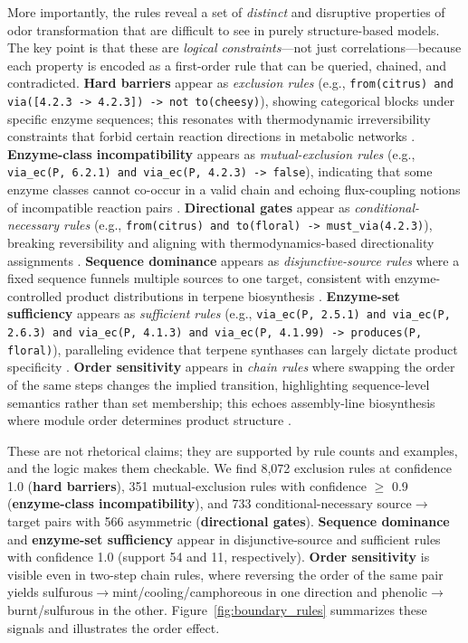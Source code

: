 \documentclass[a4paper,fleqn]{cas-sc}
\begin{document}
More importantly, the rules reveal a set of \emph{distinct} and disruptive properties of odor transformation that are difficult to see in purely structure-based models. The key point is that these are \emph{logical constraints}---not just correlations---because each property is encoded as a first-order rule that can be queried, chained, and contradicted. \textbf{Hard barriers} appear as \emph{exclusion rules} (e.g., \texttt{from(citrus) and via([4.2.3 -> 4.2.3]) -> not to(cheesy)}), showing categorical blocks under specific enzyme sequences; this resonates with thermodynamic irreversibility constraints that forbid certain reaction directions in metabolic networks \citep{Kummel2006,Martinez2014}. \textbf{Enzyme-class incompatibility} appears as \emph{mutual-exclusion rules} (e.g., \texttt{via\_ec(P, 6.2.1) and via\_ec(P, 4.2.3) -> false}), indicating that some enzyme classes cannot co-occur in a valid chain and echoing flux-coupling notions of incompatible reaction pairs \citep{Hosseini2017}. \textbf{Directional gates} appear as \emph{conditional-necessary rules} (e.g., \texttt{from(citrus) and to(floral) -> must\_via(4.2.3)}), breaking reversibility and aligning with thermodynamics-based directionality assignments \citep{Haraldsdottir2012}. \textbf{Sequence dominance} appears as \emph{disjunctive-source rules} where a fixed sequence funnels multiple sources to one target, consistent with enzyme-controlled product distributions in terpene biosynthesis \citep{Raz2020}. \textbf{Enzyme-set sufficiency} appears as \emph{sufficient rules} (e.g., \texttt{via\_ec(P, 2.5.1) and via\_ec(P, 2.6.3) and via\_ec(P, 4.1.3) and via\_ec(P, 4.1.99) -> produces(P, floral)}), paralleling evidence that terpene synthases can largely dictate product specificity \citep{Raz2020,Rudolf2020}. \textbf{Order sensitivity} appears in \emph{chain rules} where swapping the order of the same steps changes the implied transition, highlighting sequence-level semantics rather than set membership; this echoes assembly-line biosynthesis where module order determines product structure \citep{Nava2023,Nivina2019}.

These are not rhetorical claims; they are supported by rule counts and examples, and the logic makes them checkable. We find 8,072 exclusion rules at confidence 1.0 (\textbf{hard barriers}), 351 mutual-exclusion rules with confidence $\geq$ 0.9 (\textbf{enzyme-class incompatibility}), and 733 conditional-necessary source$\rightarrow$target pairs with 566 asymmetric (\textbf{directional gates}). \textbf{Sequence dominance} and \textbf{enzyme-set sufficiency} appear in disjunctive-source and sufficient rules with confidence 1.0 (support 54 and 11, respectively). \textbf{Order sensitivity} is visible even in two-step chain rules, where reversing the order of the same pair yields sulfurous$\rightarrow$mint/cooling/camphoreous in one direction and phenolic$\rightarrow$burnt/sulfurous in the other. Figure~\ref{fig:boundary_rules} summarizes these signals and illustrates the order effect.
\end{document}
